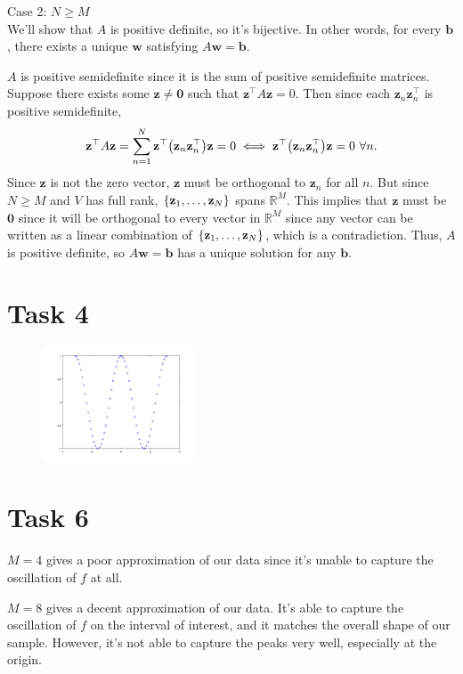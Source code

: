 \documentclass{article}
\newcommand{\T}{\top}
\renewcommand{\vec}[1]{\mathbf{#1}}
\DeclarePairedDelimiter{\p}{(}{)}
\DeclarePairedDelimiter{\set}{\{}{\}}
\begin{document}
Case 2: $N \geq M$ \\
We'll show that $A$ is positive definite, so it's bijective. In other words, for every $\vec{b}$, there exists a unique $\vec{w}$ satisfying $A\vec{w} = \vec{b}$.

$A$ is positive semidefinite since it is the sum of positive semidefinite matrices. Suppose there exists some $\vec{z} \neq \vec{0}$ such that $\vec{z}^\T A\vec{z} = 0$. Then since each $\vec{z}_n\vec{z}_n^\T$ is positive semidefinite,
\[
	\vec{z}^\T A\vec{z} = \sum_{n=1}^N \vec{z}^\T\p*{\vec{z}_n\vec{z}_n^\T}\vec{z} = 0 \iff \vec{z}^\T\p*{\vec{z}_n\vec{z}_n^\T}\vec{z} = 0\ \forall n.
\]
Since $\vec{z}$ is not the zero vector, $\vec{z}$ must be orthogonal to $\vec{z}_n$ for all $n$. But since $N \geq M$ and $V$ has full rank, $\set{\vec{z}_1, \ldots, \vec{z}_N}$ spans $\mathbb{R}^M$. This implies that $\vec{z}$ must be $\vec{0}$ since it will be orthogonal to every vector in $\mathbb{R}^M$ since any vector can be written as a linear combination of $\set{\vec{z}_1, \ldots, \vec{z}_N}$, which is a contradiction. Thus, $A$ is positive definite, so $A\vec{w} = \vec{b}$ has a unique solution for any $\vec{b}$.

\pagebreak
\section*{Task 4}
\begin{figure}[h]
	\centering
	\includegraphics[width = 0.4\textwidth]{images/data}
\end{figure}

\section*{Task 6}
$M = 4$ gives a poor approximation of our data since it's unable to capture the oscillation of $f$ at all.

$M = 8$ gives a decent approximation of our data. It's able to capture the oscillation of $f$ on the interval of interest, and it matches the overall shape of our sample. However, it's not able to capture the peaks very well, especially at the origin.
\end{document}
